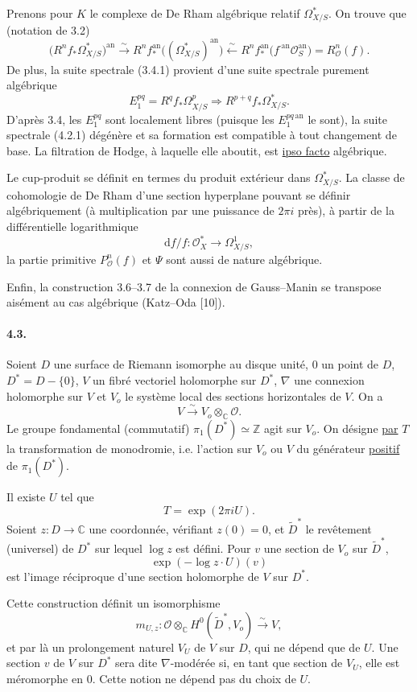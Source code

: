 \documentclass[10pt,leqno]{article}
\newcommand{\C}{\mathbb C}
\newcommand{\Z}{\mathbb Z}
\newcommand{\cO}{\mathcal O}
\theoremstyle{deligne}
\newcommand{\dd}{\mathrm d}
\renewcommand{\underline}[1]{\uline{#1}}
\begin{document}
Prenons pour $K$ le complexe de De Rham algébrique relatif $\Omega^*_{X/S}$. On trouve que (notation de 3.2)
\[
\bigl(R^n f_*\Omega^*_{X/S}\bigr)^{\mathrm{an}}
 \xrightarrow{\sim}
 R^n f_*^{\mathrm{an}}\bigl((\Omega^*_{X/S})^{\mathrm{an}}\bigr)
 \xleftarrow{\sim}
 R^n f_*^{\mathrm{an}}\bigl(f^{\cdot\mathrm{an}}\cO_S^{\mathrm{an}}\bigr)
 =
 R^n_{\cO}(f).
\]
De plus, la suite spectrale (3.4.1) provient d'une suite spectrale purement algébrique
\[
\tag{4.2.1}
E_1^{pq}=R^q f_*\Omega^p_{X/S}
\Longrightarrow
R^{p+q}f_*\Omega^*_{X/S}.
\]
D'après 3.4, les $E_1^{pq}$ sont localement libres (puisque les $E_1^{pq\,\mathrm{an}}$ le sont), la suite spectrale (4.2.1) dégénère et sa formation est compatible à tout changement de base. La filtration de Hodge, à laquelle elle aboutit, est \underline{ipso facto} algébrique.

Le cup-produit se définit en termes du produit extérieur dans $\Omega^*_{X/S}$. La classe de cohomologie de De Rham d'une section hyperplane pouvant se définir algébriquement (à multiplication par une puissance de $2\pi i$ près), à partir de la différentielle logarithmique
\[
  \dd f/f:\cO_X^*\longrightarrow \Omega^1_{X/S},
\]
la partie primitive $P^n_{\cO}(f)$ et $\Psi$ sont aussi de nature algébrique.

Enfin, la construction 3.6--3.7 de la connexion de Gauss--Manin se transpose aisément au cas algébrique (Katz--Oda [10]).

\paragraph{4.3.}
Soient $D$ une surface de Riemann isomorphe au disque unité, $0$ un point de $D$, $D^*=D-\{0\}$, $V$ un fibré vectoriel holomorphe sur $D^*$, $\nabla$ une connexion holomorphe sur $V$ et $V_o$ le système local des sections horizontales de $V$. On a
\[
  V \xrightarrow{\sim} V_o\otimes_\C \cO .
\]
Le groupe fondamental (commutatif) $\pi_1(D^*)\simeq \Z$ agit sur $V_o$. On désigne \underline{par} $T$ la transformation de monodromie, i.e. l'action sur $V_o$ ou $V$ du générateur \underline{positif} de $\pi_1(D^*)$.

Il existe $U$ tel que
\[
  T=\exp(2\pi iU).
\]
Soient $z:D\to\C$ une coordonnée, vérifiant $z(0)=0$, et $\widetilde D^*$ le revêtement (universel) de $D^*$ sur lequel $\log z$ est défini. Pour $v$ une section de $V_o$ sur $\widetilde D^*$,
\[
  \exp(-\log z\cdot U)(v)
\]
est l'image réciproque d'une section holomorphe de $V$ sur $D^*$.

Cette construction définit un isomorphisme
\[
  m_{U,z}:\cO\otimes_\C H^0(\widetilde D^*,V_o)
  \xrightarrow{\sim} V,
\]
et par là un prolongement naturel $V_U$ de $V$ sur $D$, qui ne dépend que de $U$. Une section $v$ de $V$ sur $D^*$ sera dite $\nabla$-modérée si, en tant que section de $V_U$, elle est méromorphe en $0$. Cette notion ne dépend pas du choix de $U$.
\end{document}
